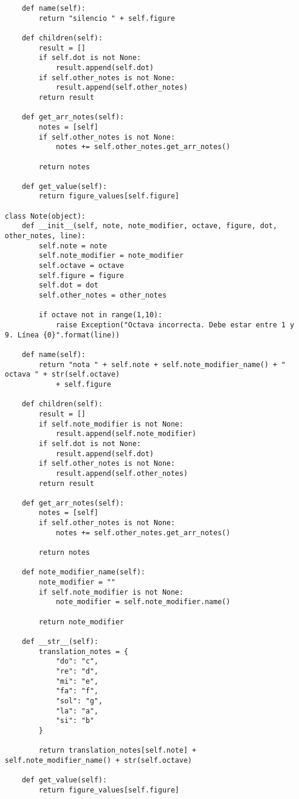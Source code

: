 \begin{verbatim}
    def name(self):
        return "silencio " + self.figure

    def children(self):
        result = []
        if self.dot is not None:
            result.append(self.dot)
        if self.other_notes is not None:
            result.append(self.other_notes)
        return result

    def get_arr_notes(self):
        notes = [self]
        if self.other_notes is not None:
            notes += self.other_notes.get_arr_notes()

        return notes

    def get_value(self):
        return figure_values[self.figure]

class Note(object):
    def __init__(self, note, note_modifier, octave, figure, dot, other_notes, line):
        self.note = note
        self.note_modifier = note_modifier
        self.octave = octave
        self.figure = figure
        self.dot = dot
        self.other_notes = other_notes

        if octave not in range(1,10):
            raise Exception("Octava incorrecta. Debe estar entre 1 y 9. Línea {0}".format(line))

    def name(self):
        return "nota " + self.note + self.note_modifier_name() + " octava " + str(self.octave)
            + self.figure

    def children(self):
        result = []
        if self.note_modifier is not None:
            result.append(self.note_modifier)
        if self.dot is not None:
            result.append(self.dot)
        if self.other_notes is not None:
            result.append(self.other_notes)
        return result

    def get_arr_notes(self):
        notes = [self]
        if self.other_notes is not None:
            notes += self.other_notes.get_arr_notes()

        return notes

    def note_modifier_name(self):
        note_modifier = ""
        if self.note_modifier is not None:
            note_modifier = self.note_modifier.name()

        return note_modifier

    def __str__(self):
        translation_notes = {
            "do": "c",
            "re": "d",
            "mi": "e",
            "fa": "f",
            "sol": "g",
            "la": "a",
            "si": "b"
        }

        return translation_notes[self.note] + self.note_modifier_name() + str(self.octave)

    def get_value(self):
        return figure_values[self.figure]
\end{verbatim}

